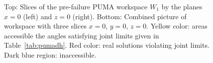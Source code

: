 \documentclass[12pt]{report}
\begin{document}
\begin{figure}
\begin{center}



\caption{
Top: Slices of the pre-failure PUMA workspace $W_1$ by the planes $x=0$ (left) and $z=0$ (right). Bottom: Combined picture of workspace with three slices $x=0$, $y=0$, $z=0$. Yellow color: areas accessible the angles satisfying joint limits  given in Table~\ref{tab:pumadh}. Red color: real solutions violating joint limits. Dark blue region: inaccessible. 
}
\label{fig:3dworkspaces}
\end{center}
\end{figure}
\end{document}

